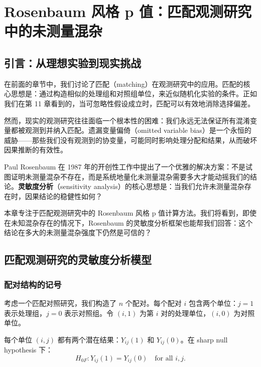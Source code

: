 
\chapter{Rosenbaum 风格 p 值：匹配观测研究中的未测量混杂}\label{ch:19}

\section{引言：从理想实验到现实挑战}\label{sec:19-intro}

在前面的章节中，我们讨论了匹配（matching）在观测研究中的应用。匹配的核心思想是：通过构造相似的处理组和对照组单位，来近似随机化实验的条件。正如我们在第 11 章看到的，当可忽略性假设成立时，匹配可以有效地消除选择偏差。

然而，现实的观测研究往往面临一个根本性的困难：我们永远无法保证所有混淆变量都被观测到并纳入匹配。遗漏变量偏倚（omitted variable bias）是一个永恒的威胁——那些我们没有观测到的协变量，可能同时影响处理分配和结果，从而破坏因果推断的有效性。

Paul Rosenbaum 在 1987 年的开创性工作中提出了一个优雅的解决方案：不是试图证明未测量混杂不存在，而是系统地量化未测量混杂需要多大才能动摇我们的结论。\textbf{灵敏度分析}（sensitivity analysis）的核心思想是：当我们允许未测量混杂存在时，因果结论的稳健性如何？

本章专注于匹配观测研究中的 Rosenbaum 风格 p 值计算方法。我们将看到，即使在未知混杂存在的情况下，Rosenbaum 的灵敏度分析框架也能帮我们回答：这个结论在多大的未测量混杂强度下仍然是可信的？

\section{匹配观测研究的灵敏度分析模型}\label{sec:19-model}

\subsection{配对结构的记号}\label{sec:19-notation}

考虑一个匹配对照研究，我们构造了 $n$ 个配对。每个配对 $i$ 包含两个单位：$j=1$ 表示处理组，$j=0$ 表示对照组。令 $(i,1)$ 为第 $i$ 对的处理单位，$(i,0)$ 为对照单位。

每个单位 $(i,j)$ 都有两个潜在结果：$Y_{ij}(1)$ 和 $Y_{ij}(0)$。在 sharp null hypothesis 下：
\[
H_{0F}: Y_{ij}(1) = Y_{ij}(0) \quad \text{for all } i,j.
\label{eq:19-sharp-null}
\]

